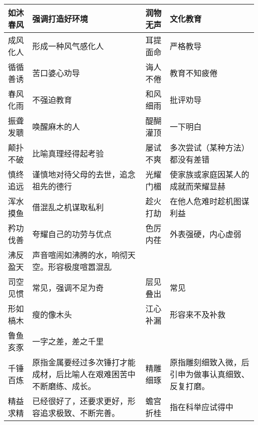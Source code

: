 \begin{longtable}{|p{}|p{}|p{}|p{}|}
    \hline
    如沐春风        & 强调打造好环境                            & 润物无声        & 文化教育                      \\
    \hline
    成风化人        & 形成一种风气感化人                          & 耳提面命        & 严格教导                      \\
    \hline
    循循善诱        & 苦口婆心劝导                             & 诲人不倦        & 教育不知疲倦                    \\
    \hline
    春风化雨        & 不强迫教育                              & 和风细雨        & 批评劝导                      \\
    \hline
    振聋发聩        & 唤醒麻木的人                             & 醍醐灌顶        & 一下明白                      \\
    \hline
    颠扑不破        & 比喻真理经得起考验                          & 屡试不爽        & 多次尝试（某种方法）都没有差错           \\
    \hline
    慎终追远        & 谨慎地对待父母的去世，追念祖先的德行                 & 光耀门楣        & 使家族或家庭因某人的成就而荣耀显赫         \\
    \hline
    浑水摸鱼        & 借混乱之机谋取私利                          & 趁火打劫        & 在他人危难时趁机图谋利益              \\
    \hline
    矜功伐善        & 夸耀自己的功劳与优点                         & 色厉内荏        & 外表强硬，内心虚弱                 \\
    \hline
    沸反盈天        & 声音喧闹如沸腾的水，响彻天空。形容极度喧嚣混乱            &             &                           \\
    \hline
    司空见惯        & 常见，强调不足为奇                          & 层见叠出        & 常见                        \\
    \hline
    形如槁木        & 瘦的像木头                              & 江心补漏        & 形容来不及补救                   \\
    \hline
    鲁鱼亥豕        & 一字之差，差之千里                          &             &                           \\
    \hline
    千锤百炼        & 原指金属要经过多次锤打才能成材，后比喻人在艰难困苦中不断磨练、成长。 & 精雕细琢        & 原指雕刻细致入微，后引申为做事认真细致、反复打磨。 \\
    \hline
    精益求精        & 已经很好了，还要求更好，形容追求极致、不断完善。           & 蟾宫折桂        & 指在科举应试得中                  \\

\end{longtable}
